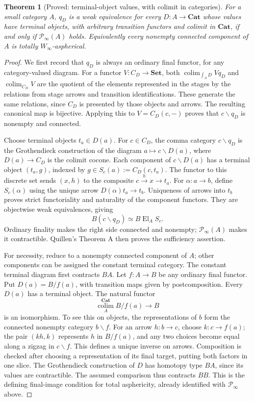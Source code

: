 \documentclass[11pt,a4paper]{article}
\newtheorem{theorem}{Theorem}[section]
\theoremstyle{definition}
\theoremstyle{remark}
\newcommand{\Cat}{\mathbf{Cat}}
\newcommand{\Set}{\mathbf{Set}}
\newcommand{\Winfty}{W_\infty}
\newcommand{\El}{\operatorname{El}}
\newcommand{\colim}{\operatorname*{colim}}
\begin{document}
\begin{theorem}[Proved: terminal-object values, with colimit in categories]
\label{F:terminal-tests}
For a small category $A$, $q_D$ is a weak equivalence for every
$D:A\to\Cat$ whose values have terminal objects, with arbitrary
transition functors and colimit in $\Cat$, if and only if
$\mathcal P_\infty(A)$ holds.  Equivalently every nonempty connected
component of $A$ is totally $\Winfty$-aspherical.
\end{theorem}
\begin{proof}
We first record that $q_D$ is always an ordinary final functor,
for any category-valued diagram.  For a functor $V:C_D\to\Set$, both
$\colim_{\int_A D}Vq_D$ and $\colim_{C_D}V$ are the quotient of
the elements represented in the stages by the relations from stage
arrows and transition identifications.  These generate the same
relations, since $C_D$ is presented by those objects and arrows.
The resulting canonical map is bijective.  Applying this to
$V=C_D(c,-)$ proves that $c\backslash q_D$ is nonempty and connected.

Choose terminal objects $t_a\in D(a)$.  For $c\in C_D$, the comma
category $c\backslash q_D$ is the Grothendieck construction of
the diagram $a\mapsto c\backslash D(a)$, where $D(a)\to C_D$ is
the colimit cocone.  Each component of $c\backslash D(a)$ has a
terminal object $(t_a,g)$, indexed by
$g\in S_c(a):=C_D(c,t_a)$.  The functor to this discrete set sends
$(x,h)$ to the composite $c\xrightarrow{h}x\to t_a$.
For $\alpha:a\to b$, define $S_c(\alpha)$ using the unique arrow
$D(\alpha)t_a\to t_b$.  Uniqueness of arrows into $t_b$ proves
strict functoriality and naturality of the component functors.
They are objectwise weak equivalences, giving
\[
 B(c\backslash q_D)\simeq B\El_A S_c.
\]
Ordinary finality makes the right side connected and nonempty;
$\mathcal P_\infty(A)$ makes it contractible.  Quillen's Theorem A
then proves the sufficiency assertion.

For necessity, reduce to a nonempty connected component of $A$;
other components can be assigned the constant terminal category.
The constant terminal diagram first contracts $BA$.
Let $f:A\to B$ be any ordinary final functor.  Put
$D(a)=B/f(a)$, with transition maps given by postcomposition.
Every $D(a)$ has a terminal object.  The natural functor
\[
 \colim_A^{\Cat}B/f(a)\longrightarrow B
\]
is an isomorphism.  To see this on objects, the representations of
$b$ form the connected nonempty category $b\backslash f$.
For an arrow $h:b\to c$, choose $k:c\to f(a)$; the pair
$(kh,k)$ represents $h$ in $B/f(a)$, and any two choices become
equal along a zigzag in $c\backslash f$.  This defines a unique
inverse on arrows.  Composition is checked after choosing a
representation of its final target, putting both factors in one
slice.  The Grothendieck construction of $D$ has homotopy type $BA$,
since its values are contractible.  The assumed comparison thus
contracts $BB$.  This is the defining final-image condition for total
asphericity, already identified with $\mathcal P_\infty$ above.
\end{proof}
\end{document}

